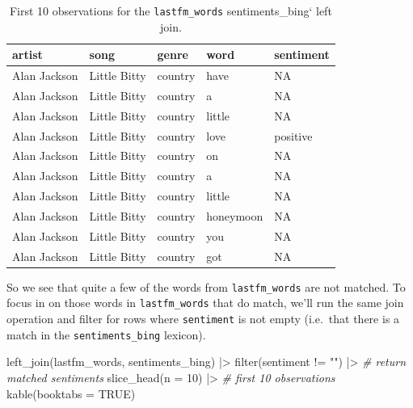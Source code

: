 \documentclass[
  letterpaper,
]{latex/krantz}
\newenvironment{Shaded}{\begin{snugshade}}{\end{snugshade}}
\newcommand{\AttributeTok}[1]{\textcolor[rgb]{0.00,0.00,0.00}{#1}}
\newcommand{\CommentTok}[1]{\textcolor[rgb]{0.00,0.00,0.00}{\textit{#1}}}
\newcommand{\ConstantTok}[1]{\textcolor[rgb]{0.00,0.00,0.00}{#1}}
\newcommand{\DecValTok}[1]{\textcolor[rgb]{0.00,0.00,0.00}{#1}}
\newcommand{\FunctionTok}[1]{\textcolor[rgb]{0.00,0.00,0.00}{#1}}
\newcommand{\NormalTok}[1]{\textcolor[rgb]{0.00,0.00,0.00}{#1}}
\newcommand{\SpecialCharTok}[1]{\textcolor[rgb]{0.00,0.00,0.00}{#1}}
\newcommand{\StringTok}[1]{\textcolor[rgb]{0.00,0.00,0.00}{#1}}
\begin{document}
\hypertarget{tbl-td-lastfm-words-bing-left-joing}{}
\begin{table}
\caption{\label{tbl-td-lastfm-words-bing-left-joing}First 10 observations for the \texttt{lastfm\_words} sentiments\_bing`
left join. }\tabularnewline

\centering
\begin{tabular}{lllll}
\toprule
artist & song & genre & word & sentiment\\
\midrule
Alan Jackson & Little Bitty & country & have & NA\\
Alan Jackson & Little Bitty & country & a & NA\\
Alan Jackson & Little Bitty & country & little & NA\\
Alan Jackson & Little Bitty & country & love & positive\\
Alan Jackson & Little Bitty & country & on & NA\\
\addlinespace
Alan Jackson & Little Bitty & country & a & NA\\
Alan Jackson & Little Bitty & country & little & NA\\
Alan Jackson & Little Bitty & country & honeymoon & NA\\
Alan Jackson & Little Bitty & country & you & NA\\
Alan Jackson & Little Bitty & country & got & NA\\
\bottomrule
\end{tabular}
\end{table}

So we see that quite a few of the words from \texttt{lastfm\_words} are
not matched. To focus in on those words in \texttt{lastfm\_words} that
do match, we'll run the same join operation and filter for rows where
\texttt{sentiment} is not empty (i.e.~that there is a match in the
\texttt{sentiments\_bing} lexicon).

\begin{Shaded}
\begin{Highlighting}[]
\FunctionTok{left\_join}\NormalTok{(lastfm\_words, sentiments\_bing) }\SpecialCharTok{|\textgreater{}}
  \FunctionTok{filter}\NormalTok{(sentiment }\SpecialCharTok{!=} \StringTok{""}\NormalTok{) }\SpecialCharTok{|\textgreater{}} \CommentTok{\# return matched sentiments}
  \FunctionTok{slice\_head}\NormalTok{(}\AttributeTok{n =} \DecValTok{10}\NormalTok{) }\SpecialCharTok{|\textgreater{}} \CommentTok{\# first 10 observations}
  \FunctionTok{kable}\NormalTok{(}\AttributeTok{booktabs =} \ConstantTok{TRUE}\NormalTok{)}
\end{Highlighting}
\end{Shaded}
\end{document}
